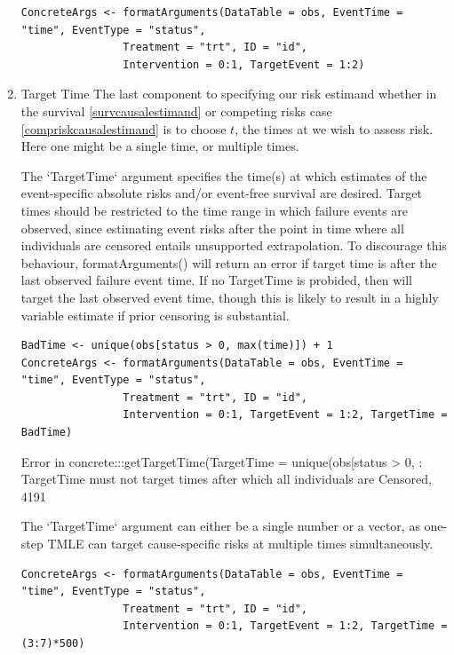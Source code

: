\documentclass{report}
\newcommand{\1}{\ensuremath{\mathbf{1}}}
\begin{document}
\begin{enumerate}
\begin{lstlisting}
ConcreteArgs <- formatArguments(DataTable = obs, EventTime = "time", EventType = "status", 
				Treatment = "trt", ID = "id", 
				Intervention = 0:1, TargetEvent = 1:2)
\end{lstlisting}

\item Target Time
\label{TargetTime}
The last component to specifying our risk estimand whether in the survival \eqref{survcausalestimand} or competing risks case \eqref{compriskcausalestimand} is to choose \(t\), the times at we wish to assess risk. Here one might be a single time, or multiple times.

The `TargetTime` argument specifies the time(s) at which estimates of the event-specific absolute risks and/or event-free survival are desired. Target times should be restricted to the time range in which failure events are observed, since estimating event risks after the point in time where all individuals are censored entails unsupported extrapolation. To discourage this behaviour, formatArguments() will return an error if target time is after the last observed failure event time. If no TargetTime is probided, then  will target the last observed event time, though this is likely to result in a highly variable estimate if prior censoring is substantial.

\begin{lstlisting}
BadTime <- unique(obs[status > 0, max(time)]) + 1
ConcreteArgs <- formatArguments(DataTable = obs, EventTime = "time", EventType = "status", 
				Treatment = "trt", ID = "id", 
				Intervention = 0:1, TargetEvent = 1:2, TargetTime = BadTime)
\end{lstlisting}

Error in concrete:::getTargetTime(TargetTime = unique(obs[status > 0,  : 
  TargetTime must not target times after which all individuals are Censored, 4191

The `TargetTime` argument can either be a single number or a vector, as one-step TMLE can target cause-specific risks at multiple times simultaneously.

\begin{lstlisting}
ConcreteArgs <- formatArguments(DataTable = obs, EventTime = "time", EventType = "status", 
				Treatment = "trt", ID = "id", 
				Intervention = 0:1, TargetEvent = 1:2, TargetTime = (3:7)*500)
\end{lstlisting}
\end{enumerate}
\end{document}
